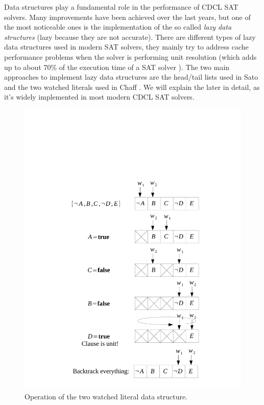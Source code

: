 \documentclass[12pt]{diicc}
\begin{document}
Data structures play a fundamental role in the performance of CDCL SAT solvers. Many improvements have been achieved over the last years, but one of the most noticeable ones is the implementation of the so called \textit{lazy data structures} (lazy because they are not accurate). There are different types of lazy data structures used in modern SAT solvers, they mainly try to address cache performance problems when the solver is performing unit resolution (which adds up to about 70\% of the execution time of a SAT solver \cite{NEEDED}). The two main approaches to implement lazy data structures are the head/tail lists used in Sato \cite{sato} and the two watched literals used in Chaff \cite{chaff}. We will explain the later in detail, as it's widely implemented in most modern CDCL SAT solvers.

\begin{figure}[h!]
	\centering
		\includegraphics[width=1.0\textwidth]{watchedliterals}
	\caption{Operation of the two watched literal data structure.}
	\label{fig:watched literals}
\end{figure}
\end{document}
